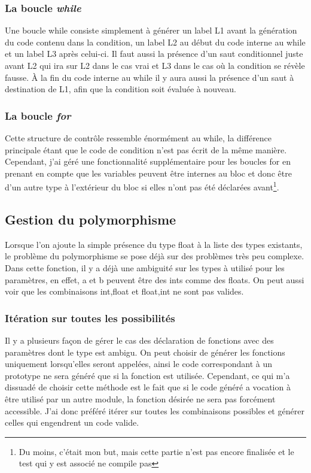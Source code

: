 \documentclass[12pt]{article}
\begin{document}
\subsubsection{La boucle \em{while}}
Une boucle while consiste simplement à générer un label L1 avant la
génération du code contenu dans la condition, un label L2 au début du code
interne au while et un label L3 après celui-ci. Il faut aussi la présence
d'un saut conditionnel juste avant L2 qui ira sur L2 dans le cas vrai et L3
dans le cas où la condition se révèle fausse. À la fin du code interne au
while il y aura aussi la présence d'un saut à destination de L1, afin que la
condition soit évaluée à nouveau.

\subsubsection{La boucle \em{for}}
Cette structure de contrôle ressemble énormément au while, la différence
principale étant que le code de condition n'est pas écrit de la même manière.
Cependant, j'ai géré une fonctionnalité supplémentaire pour les boucles for
en prenant en compte que les variables peuvent être internes au bloc et donc
être d'un autre type à l'extérieur du bloc si elles n'ont pas été déclarées
avant\footnote{Du moins, c'était mon but, mais cette partie n'est pas
encore finalisée et le test qui y est associé ne compile pas}.

\subsection{Gestion du polymorphisme}
Lorsque l'on ajoute la simple présence du type float à la liste des types
existants, le problème du polymorphisme se pose déjà sur des problèmes très
peu complexe.
Dans cette fonction, il y a déjà une ambiguité sur les types à utilisé pour
les paramètres, en effet, a et b peuvent être des ints comme des floats. On
peut aussi voir que les combinaisons int,float et float,int ne sont pas
valides.

\subsubsection{Itération sur toutes les possibilités}
Il y a plusieurs façon de gérer le cas des déclaration de fonctions avec des
paramètres dont le type est ambigu. On peut choisir de générer les fonctions
uniquement lorsqu'elles seront appelées, ainsi le code correspondant à un
prototype ne sera généré que si la fonction est utilisée. Cependant, ce qui
m'a dissuadé de choisir cette méthode est le fait que si le code généré a
vocation à être utilisé par un autre module, la fonction désirée ne sera pas
forcément accessible. J'ai donc préféré itérer sur toutes les combinaisons
possibles et générer celles qui engendrent un code valide.\\
\end{document}
